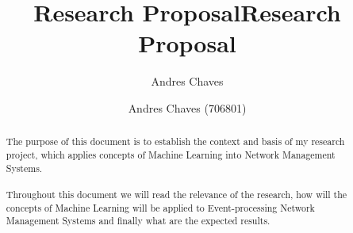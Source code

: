 \documentclass[10pt,a4paper]{article}
\author{Andres Chaves}
\title{Research Proposal}
\begin{document}
 \title{Research Proposal}
 \author{Andres Chaves (706801) \\
  }
 \maketitle

\begin{abstract}
    The purpose of this document is to establish the context and basis of my research project, which applies concepts of Machine Learning into Network Management Systems.
   \\\\
   Throughout this document we will read the relevance of the research, how will the concepts of Machine Learning will be applied to Event-processing Network Management Systems and finally what are the expected results.
\end{abstract}


\tableofcontents

\newpage
\end{document}
